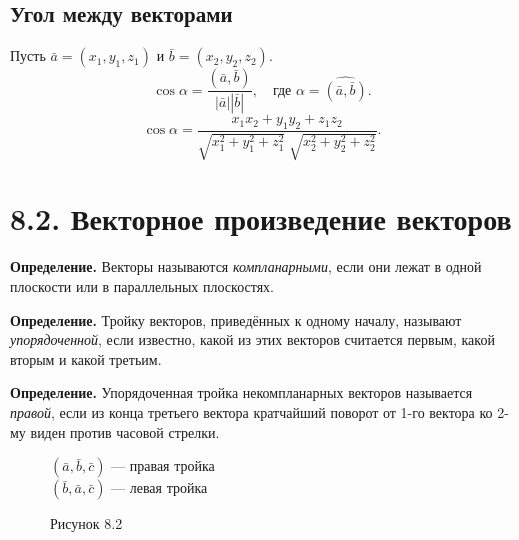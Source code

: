 \documentclass[12pt,a4paper]{article}
\newcommand{\va}{\bar{a}}
\newcommand{\vb}{\bar{b}}
\newcommand{\vc}{\bar{c}}
\begin{document}
\subsection*{Угол между векторами}

Пусть $\va = (x_1, y_1, z_1)$ и $\vb = (x_2, y_2, z_2)$.
$$
\cos\alpha = \frac{(\va,\vb)}{|\va||\vb|}, \quad \text{где } \alpha =
\widehat{(\va,\vb)}.
$$
$$
\cos\alpha =
\frac{x_1x_2 + y_1y_2 + z_1z_2}%
{\sqrt{x_1^2+y_1^2+z_1^2}\;\sqrt{x_2^2+y_2^2+z_2^2}}.
$$

\section*{8.2. Векторное произведение векторов}

\textbf{Определение.} Векторы называются \textit{компланарными}, если
они лежат в одной плоскости или в параллельных плоскостях.

\medskip

\textbf{Определение.} Тройку векторов, приведённых к одному началу,
называют \textit{упорядоченной}, если известно, какой из этих
векторов считается первым, какой вторым и какой третьим.

\medskip

\textbf{Определение.} Упорядоченная тройка некомпланарных векторов
называется \textit{правой}, если из конца третьего вектора кратчайший
поворот от 1-го вектора ко 2-му виден против часовой стрелки.

\begin{figure}[h]
  \centering
  \begin{minipage}{0.35\textwidth}
    \centering
  \end{minipage}%
  \begin{minipage}{0.55\textwidth}
    $(\va,\vb,\vc)$ --- правая тройка\\[4pt]
    $(\vb,\va,\vc)$ --- левая тройка
  \end{minipage}
  \caption*{Рисунок 8.2}
\end{figure}
\end{document}
